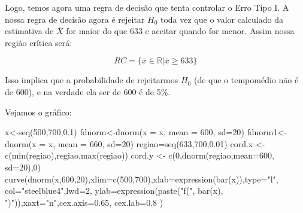 \documentclass[
  letterpaper,
  DIV=11,
  numbers=noendperiod]{scrreprt}
\newenvironment{Shaded}{\begin{snugshade}}{\end{snugshade}}
\newcommand{\AttributeTok}[1]{\textcolor[rgb]{0.40,0.45,0.13}{#1}}
\newcommand{\DecValTok}[1]{\textcolor[rgb]{0.68,0.00,0.00}{#1}}
\newcommand{\FloatTok}[1]{\textcolor[rgb]{0.68,0.00,0.00}{#1}}
\newcommand{\FunctionTok}[1]{\textcolor[rgb]{0.28,0.35,0.67}{#1}}
\newcommand{\NormalTok}[1]{\textcolor[rgb]{0.00,0.23,0.31}{#1}}
\newcommand{\OtherTok}[1]{\textcolor[rgb]{0.00,0.23,0.31}{#1}}
\newcommand{\StringTok}[1]{\textcolor[rgb]{0.13,0.47,0.30}{#1}}
\begin{document}
Logo, temos agora uma regra de decisão que tenta controlar o Erro Tipo
I. A nossa regra de decisão agora é rejeitar \(H_0\) toda vez que o
valor calculado da estimativa de \(\bar{X}\) for maior do que 633 e
aceitar quando for menor. Assim nossa região crítica será:

\[RC =\{\bar{x} \in \mathbb{R} | \bar{x} \geq 633\}\]

Isso implica que a probabilidade de rejeitarmos \(H_0\) (de que o
tempomédio não é de 600), e na verdade ela ser de 600 é de 5\%.

Vejamos o gráfico:

\begin{Shaded}
\begin{Highlighting}[]
\NormalTok{x}\OtherTok{\textless{}{-}}\FunctionTok{seq}\NormalTok{(}\DecValTok{500}\NormalTok{,}\DecValTok{700}\NormalTok{,}\FloatTok{0.1}\NormalTok{) }
\NormalTok{fdnorm}\OtherTok{\textless{}{-}}\FunctionTok{dnorm}\NormalTok{(}\AttributeTok{x =}\NormalTok{ x, }\AttributeTok{mean =} \DecValTok{600}\NormalTok{, }\AttributeTok{sd=}\DecValTok{20}\NormalTok{)  }
\NormalTok{fdnorm1}\OtherTok{\textless{}{-}}\FunctionTok{dnorm}\NormalTok{(}\AttributeTok{x =}\NormalTok{ x, }\AttributeTok{mean =} \DecValTok{660}\NormalTok{, }\AttributeTok{sd=}\DecValTok{20}\NormalTok{)}
\NormalTok{regiao}\OtherTok{=}\FunctionTok{seq}\NormalTok{(}\DecValTok{633}\NormalTok{,}\DecValTok{700}\NormalTok{,}\FloatTok{0.01}\NormalTok{)}
\NormalTok{cord.x }\OtherTok{\textless{}{-}} \FunctionTok{c}\NormalTok{(}\FunctionTok{min}\NormalTok{(regiao),regiao,}\FunctionTok{max}\NormalTok{(regiao))}
\NormalTok{cord.y }\OtherTok{\textless{}{-}} \FunctionTok{c}\NormalTok{(}\DecValTok{0}\NormalTok{,}\FunctionTok{dnorm}\NormalTok{(regiao,}\AttributeTok{mean=}\DecValTok{600}\NormalTok{, }\AttributeTok{sd=}\DecValTok{20}\NormalTok{),}\DecValTok{0}\NormalTok{) }
\FunctionTok{curve}\NormalTok{(}\FunctionTok{dnorm}\NormalTok{(x,}\DecValTok{600}\NormalTok{,}\DecValTok{20}\NormalTok{),}\AttributeTok{xlim=}\FunctionTok{c}\NormalTok{(}\DecValTok{500}\NormalTok{,}\DecValTok{700}\NormalTok{),}\AttributeTok{xlab=}\FunctionTok{expression}\NormalTok{(}\FunctionTok{bar}\NormalTok{(x)),}\AttributeTok{type=}\StringTok{"l"}\NormalTok{,}
      \AttributeTok{col=}\StringTok{"steelblue4"}\NormalTok{,}\AttributeTok{lwd=}\DecValTok{2}\NormalTok{, }\AttributeTok{ylab=}\FunctionTok{expression}\NormalTok{(}\FunctionTok{paste}\NormalTok{(}\StringTok{"f("}\NormalTok{, }\FunctionTok{bar}\NormalTok{(x),}
      \StringTok{")"}\NormalTok{)),}\AttributeTok{xaxt=}\StringTok{"n"}\NormalTok{,}\AttributeTok{cex.axis=}\FloatTok{0.65}\NormalTok{, }\AttributeTok{cex.lab=}\FloatTok{0.8}\NormalTok{ ) }

\end{Highlighting}
\end{Shaded}
\end{document}
